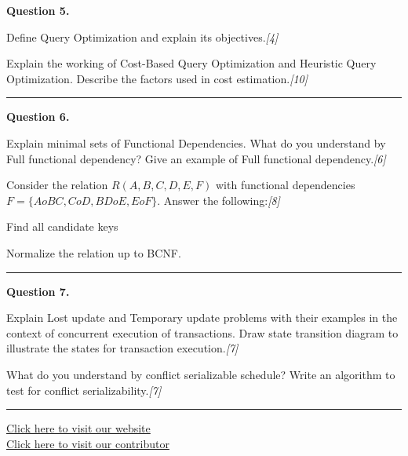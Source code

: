 \documentclass[11pt,a4paper]{article}
\newcommand{\pts}[1]{\hfill   \textit{[#1]}}
\begin{document}
\noindent   \textbf{Question 5.}

\begin{parts}
  \item Define Query Optimization and explain its objectives.\pts{4}
  \item Explain the working of Cost-Based Query Optimization and Heuristic Query Optimization. Describe the factors used in cost estimation.\pts{10}
\end{parts}

\medskip\rule{\linewidth}{0.2pt}\medskip




\noindent   \textbf{Question 6.}

\begin{parts}
  \item Explain minimal sets of Functional Dependencies. What do you understand by Full functional dependency? Give an example of Full functional dependency.\pts{6}
  \item Consider the relation $R(A, B, C, D, E, F)$ with functional dependencies $F = \{A  o BC, C  o D, BD  o E, E  o F\}$. Answer the following:\pts{8}
  
\begin{parts}
    \item Find all candidate keys
    \item Normalize the relation up to BCNF.
  \end{parts}
\end{parts}

\medskip\rule{\linewidth}{0.2pt}\medskip




\noindent   \textbf{Question 7.}

\begin{parts}
  \item Explain Lost update and Temporary update problems with their examples in the context of concurrent execution of transactions. Draw state transition diagram to illustrate the states for transaction execution.\pts{7}
  \item What do you understand by conflict serializable schedule? Write an algorithm to test for conflict serializability.\pts{7}
\end{parts}

\vfill
\rule{\linewidth}{0.4pt}

\begin{center}\small
\href{https://bhu-exam.vercel.app/}{Click here to visit our website}\\[4pt]
\href{https://me-aryan.vercel.app/}{Click here to visit our contributor}
\end{center}
\end{document}
